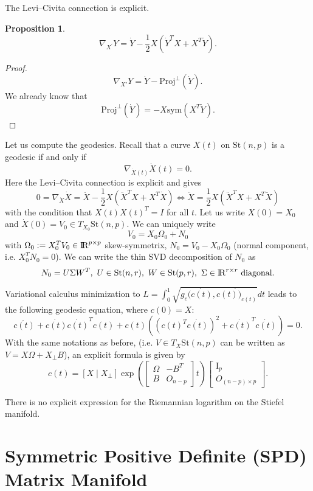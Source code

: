 \documentclass[10pt,a4paper]{book}
\theoremstyle{definition}
\theoremstyle{plain}
\newtheorem{prop}{Proposition}[section]
\theoremstyle{remark}
\newcommand \Stif {\textrm{St}}
\def\R{{\rm I\kern-0.16em R}}
\def\B{{\rm I\kern-0.16em B}}
\begin{document}
The Levi--Civita connection is explicit.
\begin{prop}
$$\nabla_{X^{\prime}}Y=\dot{Y}-\frac{1}{2}X(\dot{Y}^{T}X+X^{T}\dot{Y}).$$
\end{prop}
\begin{proof}
$$\nabla_{X'}Y=\dot{Y}-\text{Proj}^{\bot}(\dot{Y}).$$
We already know that
$$\text{Proj}^{\bot}(\dot{Y})=-X\text{sym}(X^{T}\dot{Y}).$$
\end{proof}




Let us compute the geodesics. Recall that a curve $X(t)$ on $\Stif(n,p)$ is a geodesic if and only if
$$\nabla_{\dot{X}(t)}\dot{X}(t)=0.$$
Here the Levi--Civita connection is explicit and gives 
$$0=\nabla_{\dot{X}}\dot{X}=\ddot{X}-\frac{1}{2}X(\ddot{X}^TX+X^{T}\dot{X}) \iff \ddot{X}=\frac{1}{2}X(\ddot{X}^TX+X^{T}\ddot{X})$$ with the condition that $X(t)X(t)^{T}=I$ for all $t$. 
Let us write $X(0)=X_0$ and $\dot{X}(0)=V_0 \in T_{X_0}\Stif(n,p)$. We can uniquely write
$$V_0=X_0\Omega_0+N_0$$
with $\Omega_0:=X_0^TV_0 \in \R^{p\times p}$ skew-symmetrix, $N_0=V_0-X_0\Omega_0$ (normal component, i.e. $X_0^TN_0=0$).
We can write the thin SVD decomposition of $N_0$ as
$$N_0=U\Sigma W^{T},~U \in \Stif(n,r),~W\in \Stif(p,r),~\Sigma \in \R^{r\times r} \text{ diagonal}.$$

Variational calculus minimization to $L=\int _0^{1}\sqrt{g_c(\dot{c(t)},\dot{c(t))_{c(t)}}}dt$ leads to the following geodesic equation, where $c(0)=X$:
$$\ddot{c(t)}+\dot{c(t)}\dot{c(t)}^Tc(t)+c(t)((c(t)^T\dot{c(t)})^2+\dot{c(t)}^T\dot{c(t)})=0.$$
With the same notations as before, (i.e. $V\in T_X\Stif(n,p)$ can be written as $V=X\Omega+X_{\bot}B$), an explicit formula is given by
$$c(t)=[X \mid X_{\bot}]\exp \left( \left[\begin{array}{cc}\Omega & -B^{T} \\B & O_{n-p}\end{array}\right]t\right)\left[\begin{array}{c}\text{I}_p \\O_{(n-p)\times p}\end{array}\right].$$

There is no explicit expression for the Riemannian logarithm on the Stiefel manifold.



\section{Symmetric Positive Definite (SPD) Matrix Manifold}
\end{document}
